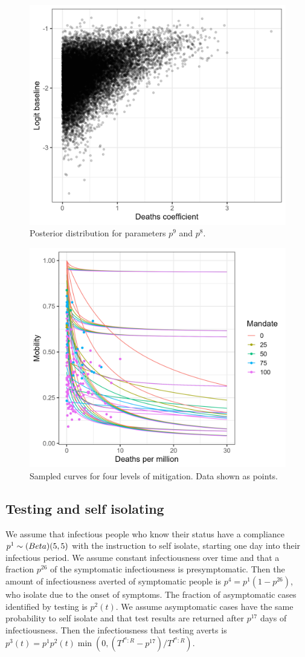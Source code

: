 \documentclass[
]{article}
\begin{document}
\begin{figure}
\includegraphics[width=0.5\linewidth]{README_files/figure-gfm/mobilityposterior} \caption{Posterior distribution for parameters $p^9$ and $p^8$.}\label{fig:mobilityposterior}
\end{figure}

\begin{figure}
\includegraphics[width=0.5\linewidth]{README_files/figure-gfm/mobilitycurves} \caption{Sampled curves for four levels of mitigation. Data shown as points.}\label{fig:mobilitycurves}
\end{figure}

\subsection{Testing and self isolating}\label{testing-and-self-isolating}

We assume that infectious people who know their status have a compliance \(p^1\sim\text(Beta)(5,5)\) with the instruction to self isolate, starting one day into their infectious period. We assume constant infectiousness over time and that a fraction \(p^{26}\) of the symptomatic infectiousness is presymptomatic. Then the amount of infectiousness averted of symptomatic people is \(p^4=p^1(1-p^{26})\), who isolate due to the onset of symptoms. The fraction of asymptomatic cases identified by testing is \(p^2(t)\). We assume asymptomatic cases have the same probability to self isolate and that test results are returned after \(p^{17}\) days of infectiousness. Then the infectiousness that testing averts is \(p^3(t)=p^1p^2(t)\min(0,(T^{I^a:R}-p^{17})/T^{I^a:R})\).
\end{document}
